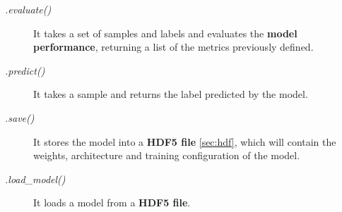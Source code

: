 \begin{description}
	\item[\textit{.evaluate()}] It takes a set of samples and labels and evaluates the \textbf{model performance}, returning a list of the metrics previously defined.
\end{description}

\begin{description}
	\item[\textit{.predict()}] It takes a sample and returns the label predicted by the model.
\end{description}

\begin{description}
	\item[\textit{.save()}] It stores the model into a \textbf{HDF5 file} \ref{sec:hdf}, which will contain the weights, architecture and training configuration of the model.
\end{description}

\begin{description}
	\item[\textit{.load\_model()}] It loads a model from a \textbf{HDF5 file}.
\end{description}

